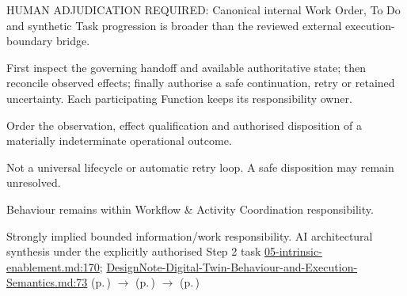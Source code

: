 HUMAN ADJUDICATION REQUIRED: Canonical internal Work Order, To Do and synthetic Task progression is broader than the reviewed external execution-boundary bridge.



First inspect the governing handoff and available authoritative state; then reconcile observed effects; finally authorise a safe continuation, retry or retained uncertainty. Each participating Function keeps its responsibility owner.



Order the observation, effect qualification and authorised disposition of a materially indeterminate operational outcome.



Not a universal lifecycle or automatic retry loop. A safe disposition may remain unresolved.



Behaviour remains within Workflow \& Activity Coordination responsibility.


Strongly implied bounded information/work responsibility. AI architectural synthesis under the explicitly authorised Step 2 task \hyperref[evidence:d70bf9b0b197558f]{05-intrinsic-enablement.md:170}; \hyperref[evidence:ec6250f7cf7c29a5]{DesignNote-Digital-Twin-Behaviour-and-Execution-Semantics.md:73}
 (p.\,\pageref{function:establish-activity-effect-observation-basis}) $\rightarrow$  (p.\,\pageref{function:reconcile-indeterminate-activity-effects}) $\rightarrow$  (p.\,\pageref{function:determine-reconciled-activity-continuation})
